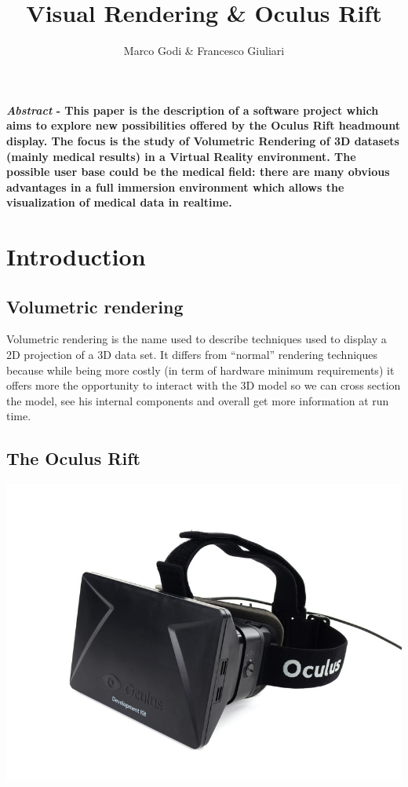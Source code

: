 \documentclass[11pt]{article} %
\title{Visual Rendering \& Oculus Rift}
\author{Marco Godi \& Francesco Giuliari}
\affil{Università degli Studi di Verona}
\begin{document}
\maketitle


\tableofcontents





\newpage
\textbf{\textit{Abstract} - This paper is the description of a software project which aims to explore new possibilities offered by the Oculus Rift headmount display. The focus is the study of Volumetric Rendering of 3D datasets (mainly medical results) in a Virtual Reality environment. The possible user base could be the medical field: there are many obvious advantages in a full immersion environment which allows the visualization of medical data in realtime. }
\section {Introduction}

\subsection{Volumetric rendering}
Volumetric rendering is the name used to describe techniques used to display a 2D projection of a 3D data set. It differs from ``normal'' rendering techniques because while being more costly (in term of hardware minimum requirements) it offers more the opportunity to interact with the 3D model so we can cross section the model, see his internal components and overall get more information at run time.  

\subsection{The Oculus Rift}
\includegraphics[scale=0.5]{oculus.jpg}
\end{document}
